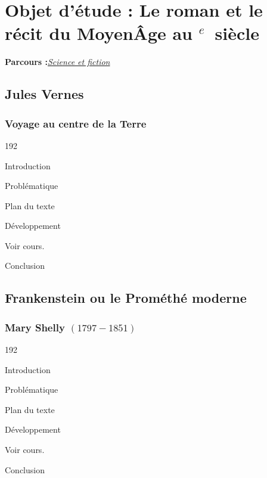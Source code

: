 \documentclass[12pt,a4paper]{article}
\begin{document}
		\section[Sciences et fiction]{Objet d'\'etude : Le roman et le r\'ecit du Moyen\^Age au \textsc{}$^{e}$~siècle}
		\textbf{Parcours :}\textit{\underline{Science et fiction}}
			\subsection{Jules Vernes}
				\subsubsection{Voyage au centre de la Terre}
\begin{dingautolist}{192}

\item Introduction \par
\item Probl\'ematique \par
\item Plan du texte \par
\item D\'eveloppement \par
        Voir cours.

\item Conclusion \par

\end{dingautolist}

\subsection{Frankenstein ou le Prom\'eth\'e moderne}
				\subsubsection{Mary Shelly $(1797 - 1851) $}
\begin{dingautolist}{192}

\item Introduction \par
\item Probl\'ematique \par
\item Plan du texte \par
\item D\'eveloppement \par
        Voir cours.

\item Conclusion \par

\end{dingautolist}
\end{document}
